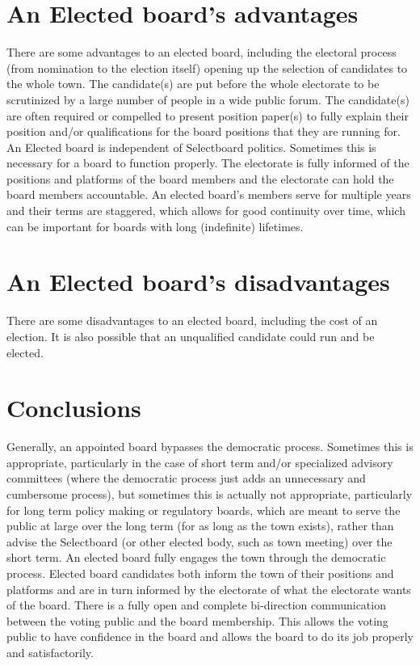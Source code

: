 \documentclass[12pt]{article}
\begin{document}
\section{An Elected board's advantages}

There are some advantages to an elected board, including the electoral
process (from nomination to the election itself) opening up the selection of
candidates to the whole town. The candidate(s) are put before the whole
electorate to be scrutinized by a large number of people in a wide public
forum. The candidate(s) are often required or compelled to present position
paper(s) to fully explain their position and/or qualifications for the board
positions that they are running for. An Elected board is independent of
Selectboard politics. Sometimes this is necessary for a board to function
properly. The electorate is fully informed of the positions and platforms of
the board members and the electorate can hold the board members accountable. 
An elected board's members serve for multiple years and their terms are 
staggered, which allows for good continuity over time, which can be important 
for boards with long (indefinite) lifetimes.

\section{An Elected board's disadvantages}

There are some disadvantages to an  elected board, including the cost of an 
election. It is also possible that an unqualified candidate could run and be 
elected. 

\section{Conclusions}

Generally, an appointed board bypasses the democratic process. Sometimes this
is appropriate, particularly in the case of short term and/or specialized
advisory committees (where the democratic process just adds an unnecessary and
cumbersome process), but sometimes this is actually not appropriate,
particularly for long term policy making or regulatory boards, which are meant
to serve the public at large over the long term (for as long as the town
exists), rather than advise the Selectboard (or other elected body, such as
town meeting) over the short term. An elected board fully engages the town
through the democratic process. Elected board candidates both inform the town
of their positions and platforms and are in turn informed by the electorate of
what the electorate wants of the board. There is a fully open and complete
bi-direction communication between the voting public and the board membership.
This allows the voting public to have confidence in the board and allows the
board to do its job properly and satisfactorily.
\end{document}
